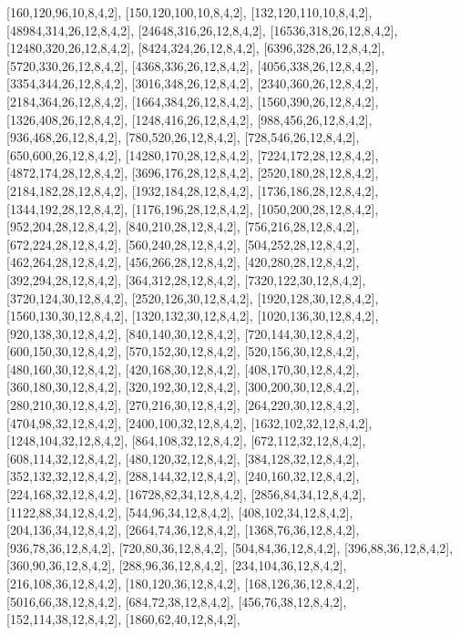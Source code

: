 \documentclass[12pt]{amsart}
\begin{document}
[160,120,96,10,8,4,2],   [150,120,100,10,8,4,2],   [132,120,110,10,8,4,2],   [48984,314,26,12,8,4,2],   [24648,316,26,12,8,4,2],   [16536,318,26,12,8,4,2],
[12480,320,26,12,8,4,2],   [8424,324,26,12,8,4,2],   [6396,328,26,12,8,4,2],   [5720,330,26,12,8,4,2],   [4368,336,26,12,8,4,2],   [4056,338,26,12,8,4,2],
[3354,344,26,12,8,4,2],   [3016,348,26,12,8,4,2],   [2340,360,26,12,8,4,2],   [2184,364,26,12,8,4,2],   [1664,384,26,12,8,4,2],   [1560,390,26,12,8,4,2],
[1326,408,26,12,8,4,2],   [1248,416,26,12,8,4,2],   [988,456,26,12,8,4,2],   [936,468,26,12,8,4,2],   [780,520,26,12,8,4,2],   [728,546,26,12,8,4,2],
[650,600,26,12,8,4,2],   [14280,170,28,12,8,4,2],   [7224,172,28,12,8,4,2],   [4872,174,28,12,8,4,2],   [3696,176,28,12,8,4,2],   [2520,180,28,12,8,4,2],
[2184,182,28,12,8,4,2],   [1932,184,28,12,8,4,2],   [1736,186,28,12,8,4,2],   [1344,192,28,12,8,4,2],   [1176,196,28,12,8,4,2],   [1050,200,28,12,8,4,2],
[952,204,28,12,8,4,2],   [840,210,28,12,8,4,2],   [756,216,28,12,8,4,2],   [672,224,28,12,8,4,2],   [560,240,28,12,8,4,2],   [504,252,28,12,8,4,2],
[462,264,28,12,8,4,2],   [456,266,28,12,8,4,2],   [420,280,28,12,8,4,2],   [392,294,28,12,8,4,2],   [364,312,28,12,8,4,2],   [7320,122,30,12,8,4,2],
[3720,124,30,12,8,4,2],   [2520,126,30,12,8,4,2],   [1920,128,30,12,8,4,2],   [1560,130,30,12,8,4,2],   [1320,132,30,12,8,4,2],   [1020,136,30,12,8,4,2],
[920,138,30,12,8,4,2],   [840,140,30,12,8,4,2],   [720,144,30,12,8,4,2],   [600,150,30,12,8,4,2],   [570,152,30,12,8,4,2],   [520,156,30,12,8,4,2],
[480,160,30,12,8,4,2],   [420,168,30,12,8,4,2],   [408,170,30,12,8,4,2],   [360,180,30,12,8,4,2],   [320,192,30,12,8,4,2],   [300,200,30,12,8,4,2],
[280,210,30,12,8,4,2],   [270,216,30,12,8,4,2],   [264,220,30,12,8,4,2],   [4704,98,32,12,8,4,2],   [2400,100,32,12,8,4,2],   [1632,102,32,12,8,4,2],
[1248,104,32,12,8,4,2],   [864,108,32,12,8,4,2],   [672,112,32,12,8,4,2],   [608,114,32,12,8,4,2],   [480,120,32,12,8,4,2],   [384,128,32,12,8,4,2],
[352,132,32,12,8,4,2],   [288,144,32,12,8,4,2],   [240,160,32,12,8,4,2],   [224,168,32,12,8,4,2],   [16728,82,34,12,8,4,2],   [2856,84,34,12,8,4,2],
[1122,88,34,12,8,4,2],   [544,96,34,12,8,4,2],   [408,102,34,12,8,4,2],   [204,136,34,12,8,4,2],   [2664,74,36,12,8,4,2],   [1368,76,36,12,8,4,2],   [936,78,36,12,8,4,2],
[720,80,36,12,8,4,2],   [504,84,36,12,8,4,2],   [396,88,36,12,8,4,2],   [360,90,36,12,8,4,2],   [288,96,36,12,8,4,2],   [234,104,36,12,8,4,2],   [216,108,36,12,8,4,2],
[180,120,36,12,8,4,2],   [168,126,36,12,8,4,2],   [5016,66,38,12,8,4,2],   [684,72,38,12,8,4,2],   [456,76,38,12,8,4,2],   [152,114,38,12,8,4,2],   [1860,62,40,12,8,4,2],
\end{document}
